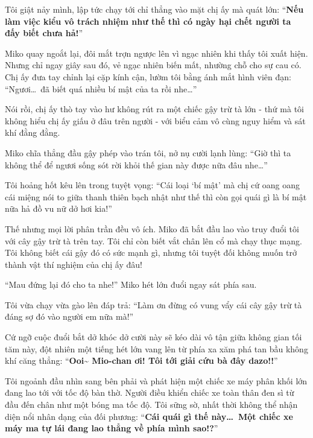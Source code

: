 \documentclass[../main.tex]{subfiles}
\begin{document}
Tôi giật nảy mình, lập tức chạy tới chỉ thẳng vào mặt chị ấy mà quát lớn:
``\textbf{Nếu làm việc kiểu vô trách nhiệm như thế thì có ngày hại chết người ta đấy biết chưa hả!}''


Miko quay ngoắt lại, đôi mắt trợn ngược lên vì ngạc nhiên khi thấy tôi xuất hiện. Nhưng chỉ ngay giây sau đó, vẻ ngạc nhiên biến mất, nhường chỗ cho sự cau có. Chị ấy đưa tay chỉnh lại cặp kính cận, lườm tôi bằng ánh mắt hình viên đạn:
``Ngươi\dots\ đã biết quá nhiều bí mật của ta rồi nhe\dots''

Nói rồi, chị ấy thò tay vào hư không rút ra một chiếc gậy trừ tà lớn - thứ mà tôi không hiểu chị ấy giấu ở đâu trên người - với biểu cảm vô cùng nguy hiểm và sát khí đằng đằng.

Miko chĩa thẳng đầu gậy phép vào trán tôi, nở nụ cười lạnh lùng:
``Giờ thì ta không thể để ngươi sống sót rời khỏi thế gian này được nữa đâu nhe\dots''

Tôi hoảng hốt kêu lên trong tuyệt vọng:
``Cái loại `bí mật' mà chị cứ oang oang cái miệng nói to giữa thanh thiên bạch nhật như thế thì còn gọi quái gì là bí mật nữa hả đồ vu nữ dở hơi kia!''


Thế nhưng mọi lời phân trần đều vô ích. Miko đã bắt đầu lao vào truy đuổi tôi với cây gậy trừ tà trên tay. Tôi chỉ còn biết vắt chân lên cổ mà chạy thục mạng. Tôi không biết cái gậy đó có sức mạnh gì, nhưng tôi tuyệt đối không muốn trở thành vật thí nghiệm của chị ấy đâu!

``Mau đứng lại đó cho ta nhe!'' Miko hét lớn đuổi ngay sát phía sau.

Tôi vừa chạy vừa gào lên đáp trả:
``Làm ơn đừng có vung vẩy cái cây gậy trừ tà đáng sợ đó vào người em nữa mà!''

Cứ ngỡ cuộc đuổi bắt dở khóc dở cười này sẽ kéo dài vô tận giữa không gian tối tăm này, đột nhiên một tiếng hét lớn vang lên từ phía xa xăm phá tan bầu không khí căng thẳng:
``\textbf{Ooi\~{} Mio-chan ơi! Tôi tới giải cứu bà đây dazo!!}''

Tôi ngoảnh đầu nhìn sang bên phải và phát hiện một chiếc xe máy phân khối lớn đang lao tới với tốc độ bàn thờ. Người điều khiển chiếc xe toàn thân đen sì từ đầu đến chân như một bóng ma tốc độ. Tôi sững sờ, nhất thời không thể nhận diện nổi nhân dạng của đối phương: ``\textbf{Cái quái gì thế này\dots\ Một chiếc xe máy ma tự lái đang lao thẳng về phía mình sao!?}''

\end{document}
